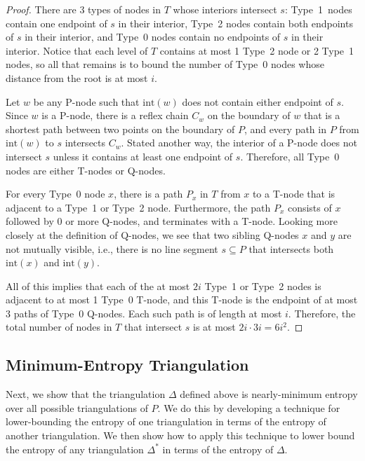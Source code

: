 \documentclass[lotsofwhite]{patmorin}
\newcommand{\interior}{\mathrm{int}}
\begin{document}
\begin{proof}
There are 3 types of nodes in $T$ whose interiors intersect $s$:
Type~1~nodes contain one endpoint of $s$ in their interior, Type~2
nodes contain both endpoints of $s$ in their interior, and Type~0
nodes contain no endpoints of $s$ in their interior.  Notice that each
level of $T$ contains at most 1 Type~2 node or 2 Type~1 nodes, so all
that remains is to bound the number of Type~0 nodes whose distance
from the root is at most $i$.

Let $w$ be any P-node such that $\interior(w)$ does not contain either
endpoint of $s$.  Since $w$ is a P-node, there is a reflex chain $C_w$
on the boundary of $w$ that is a shortest path between two points on
the boundary of $P$, and every path in $P$ from $\interior(w)$ to $s$
intersects $C_w$. Stated another way, the interior of a P-node does
not intersect $s$ unless it contains at least one endpoint of $s$.
Therefore, all Type~0 nodes are either T-nodes or Q-nodes.

For every Type~0 node $x$, there is a path $P_x$ in $T$ from $x$ to a
T-node that is adjacent to a Type~1 or Type~2 node.  Furthermore, the
path $P_x$ consists of $x$ followed by 0 or more Q-nodes, and
terminates with a T-node.  Looking more closely at the definition of
Q-nodes, we see that two sibling Q-nodes $x$ and $y$ are not mutually
visible, i.e., there is no line segment $s\subseteq P$ that intersects
both $\interior(x)$ and $\interior(y)$.

All of this implies that each of the at most $2i$ Type~1 or Type~2 
nodes is adjacent to at most 1 Type~0 T-node, and this T-node is the
endpoint of at most 3 paths of Type~0 Q-nodes. Each such path is of
length at most $i$.  Therefore, the total number of nodes in $T$ that
intersect $s$ is at most  $2i\cdot 3i=6i^2$.
\end{proof}

\subsection{Minimum-Entropy Triangulation}

Next, we show that the triangulation $\Delta$ defined above is
nearly-minimum entropy over all possible triangulations of $P$.  We do
this by developing a technique for lower-bounding the entropy of one
triangulation in terms of the entropy of another triangulation.  We
then show how to apply this technique to lower bound the entropy of
any triangulation $\Delta^*$ in terms of the entropy of $\Delta$.
  
\end{document}
